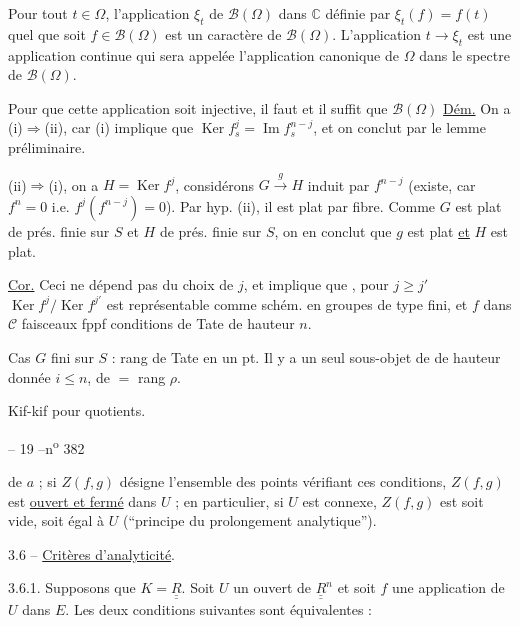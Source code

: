 Pour tout $t\in\Omega$, l'application $\xi_t$ de $\mathcal B(\Omega)$ dans $\mathbb C$ définie par $\xi_t(f)=f(t)$ quel que soit $f\in\mathcal B(\Omega)$ est un caractère de $\mathcal B(\Omega)$. L'application $t\longrightarrow\xi_t$ est une application continue qui sera appelée l'application canonique de $\Omega$ dans le spectre de $\mathcal B(\Omega)$.

Pour que cette application soit injective, il faut et il suffit que $\mathcal B(\Omega)$
\uline{Dém.} On a (i)$\Longrightarrow$(ii), car (i) implique que $\operatorname{Ker}f_s^j=\operatorname{Im}f_s^{n-j}$, et on conclut par le lemme préliminaire.

 (ii)$\Longrightarrow$(i), on a $H=\operatorname{Ker}f^j$, considérons $G\xrightarrow{g}H$ induit par $f^{n-j}$ (existe, car $f^n=0$ i.e. $f^j(f^{n-j})=0$). Par hyp. (ii), il est  plat par fibre. Comme $G$ est plat de prés. finie sur $S$ et $H$ de prés. finie sur $S$, on en conclut que $g$ est  plat \uline{et} $H$ est plat.

\uline{Cor.} Ceci ne dépend pas du choix de $j$, et implique que  ,  pour $j\geq j'$ $\operatorname{Ker}f^j/\operatorname{Ker}f^{j'}$ est représentable comme schém. en groupes de type fini, et $f$ dans $\mathcal C$ faisceaux  fppf    conditions de Tate de hauteur $n$.

Cas $G$ fini sur $S$ : rang de Tate en un pt.
Il y a un seul sous-objet de  de hauteur donnée $i\leq n$, de $=$ rang $\rho$.

Kif-kif pour quotients.
\begin{center}-- 19 --\hfill n\textsuperscript{o} 382\end{center}
de $a$ ; si $Z(f,g)$ désigne l'ensemble des points vérifiant ces conditions, $Z(f,g)$ est \uline{ouvert et fermé} dans $U$ ; en particulier, si $U$ est connexe, $Z(f,g)$ est soit vide, soit égal à $U$ (``principe du prolongement analytique'').

3.6 -- \uline{Critères d'analyticité}.

3.6.1. Supposons que $K=\underline{\underline{R}}$. Soit $U$ un ouvert de $\underline{\underline{R}}^n$ et soit $f$ une application de $U$ dans $E$. Les deux conditions suivantes sont équivalentes :

